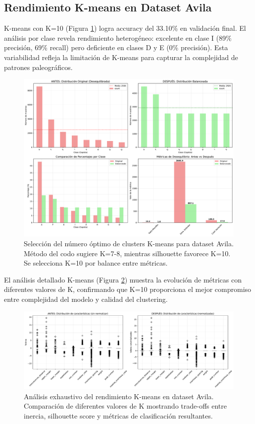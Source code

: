 \documentclass[12pt,a4paper]{article}
\begin{document}
\subsection{Rendimiento K-means en Dataset Avila}

K-means con K=10 (Figura \ref{fig:kmeans_avila}) logra accuracy del 33.10\% en validación final. El análisis por clase revela rendimiento heterogéneo: excelente en clase I (89\% precisión, 69\% recall) pero deficiente en clases D y E (0\% precisión). Esta variabilidad refleja la limitación de K-means para capturar la complejidad de patrones paleográficos.

\begin{figure}[H]
    \centering
    \includegraphics[width=\textwidth]{figures/figura_08_comparacion_kmeans_avila.pdf}
    \caption{Selección del número óptimo de clusters K-means para dataset Avila. Método del codo sugiere K=7-8, mientras silhouette favorece K=10. Se selecciona K=10 por balance entre métricas.}
    \label{fig:kmeans_avila}
\end{figure}

El análisis detallado K-means (Figura \ref{fig:analisis_kmeans_avila}) muestra la evolución de métricas con diferentes valores de K, confirmando que K=10 proporciona el mejor compromiso entre complejidad del modelo y calidad del clustering.

\begin{figure}[H]
    \centering
    \includegraphics[width=\textwidth]{figures/figura_09_analisis_kmeans_avila.pdf}
    \caption{Análisis exhaustivo del rendimiento K-means en dataset Avila. Comparación de diferentes valores de K mostrando trade-offs entre inercia, silhouette score y métricas de clasificación resultantes.}
    \label{fig:analisis_kmeans_avila}
\end{figure}
\end{document}
